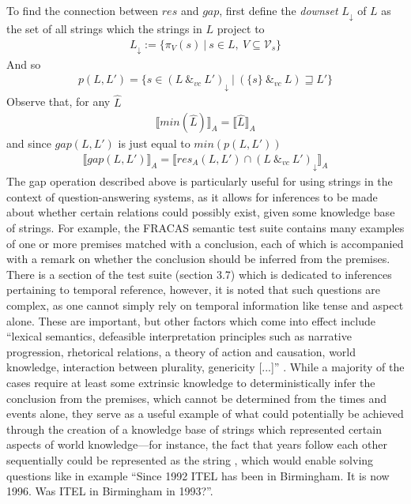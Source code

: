 \documentclass[a4paper,12pt,leqno,twoside]{article}
\newcommand{\vph}[1]{\vphantom{#1}}
\newcommand{\ebox}[1]{\fbox{$\vph{'(),}#1$}}
\newcommand{\spvc}{~\&_{v\!c}~}
\newcommand{\V}{\mathcal{V}}
\newcommand{\EventString}[1]{%
	\renewcommand*{\do}[1]{\ebox{##1}}%
	\PipeParser{#1}%
}
\begin{document}
To find the connection between $res$ and $gap$, first define the \textit{downset} $L_\downarrow$ of $L$ as the set of all strings which the strings in $L$ project to
\begin{align}
	L_\downarrow := \{ \pi_V(s) ~|~ s \in L,~ V \subseteq \V_s \}
\end{align}
And so
\begin{align}
	p(L, L') = \{s \in (L \spvc L')_\downarrow ~|~ (\{s\} \spvc L) \sqsupseteq L'\}
\end{align}
Observe that, for any $\hat{L}$
\begin{align}
	\llbracket min(\hat{L}) \rrbracket_A = \llbracket \hat{L} \rrbracket_A
\end{align}
and since $gap(L, L')$ is just equal to $min(p(L, L'))$
\begin{align}
	\llbracket gap(L, L') \rrbracket_A = \llbracket res_A(L, L') \cap (L \spvc L')_\downarrow \rrbracket_A
\end{align}
The gap operation described above is particularly useful for using strings in the context of question-answering systems, as it allows for inferences to be made about whether certain relations could possibly exist, given some knowledge base of strings. For example, the FRACAS semantic test suite \citep{cooper1996using} contains many examples of one or more premises matched with a conclusion, each of which is accompanied with a remark on whether the conclusion should be inferred from the premises. There is a section of the test suite (section 3.7) which is dedicated to inferences pertaining to temporal reference, however, it is noted that such questions are complex, as one cannot simply rely on temporal information like tense and aspect alone. These are important, but other factors which come into effect include ``lexical semantics, defeasible interpretation principles such as narrative progression, rhetorical relations, a theory of action and causation, world knowledge, interaction between plurality, genericity [...]'' \citep[p. 101]{cooper1996using}. While a majority of the cases require at least some extrinsic knowledge to deterministically infer the conclusion from the premises, which cannot be determined from the times and events alone, they serve as a useful example of what could potentially be achieved through the creation of a knowledge base of strings which represented certain aspects of world knowledge---for instance, the fact that years follow each other sequentially could be represented as the string \EventString{{}|...|1992|1993|...|{}}, which would enable solving questions like in example \citep[3.252, p. 101]{cooper1996using} ``Since 1992 ITEL has been in Birmingham. It is now 1996. Was ITEL in Birmingham in 1993?''.
\end{document}
